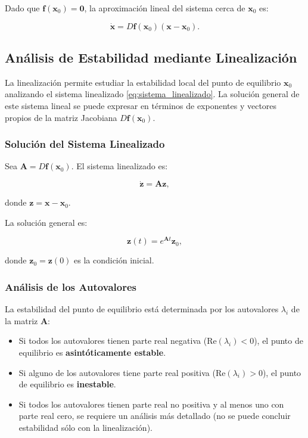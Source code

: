 \documentclass[12pt, a4paper]{report}
\begin{document}
Dado que \(\mathbf{f}(\mathbf{x}_0) = \mathbf{0}\), la aproximación lineal del sistema cerca de \(\mathbf{x}_0\) es:

\begin{equation}\label{eq:sistema_linealizado}
    \dot{\mathbf{x}} = D\mathbf{f}(\mathbf{x}_0)(\mathbf{x} - \mathbf{x}_0).
\end{equation}

\subsection{Análisis de Estabilidad mediante Linealización}

La linealización permite estudiar la estabilidad local del punto de equilibrio \(\mathbf{x}_0\) analizando el sistema linealizado \eqref{eq:sistema_linealizado}. La solución general de este sistema lineal se puede expresar en términos de exponentes y vectores propios de la matriz Jacobiana \( D\mathbf{f}(\mathbf{x}_0) \).

\subsubsection{Solución del Sistema Linealizado}

Sea \( \mathbf{A} = D\mathbf{f}(\mathbf{x}_0) \). El sistema linealizado es:

\begin{equation}
    \dot{\mathbf{z}} = \mathbf{A} \mathbf{z},
\end{equation}

donde \( \mathbf{z} = \mathbf{x} - \mathbf{x}_0 \).

La solución general es:

\begin{equation}
    \mathbf{z}(t) = e^{\mathbf{A} t} \mathbf{z}_0,
\end{equation}

donde \( \mathbf{z}_0 = \mathbf{z}(0) \) es la condición inicial.

\subsubsection{Análisis de los Autovalores}

La estabilidad del punto de equilibrio está determinada por los autovalores \( \lambda_i \) de la matriz \( \mathbf{A} \):

\begin{itemize}
    \item Si todos los autovalores tienen parte real negativa (\( \text{Re}(\lambda_i) < 0 \)), el punto de equilibrio es \textbf{asintóticamente estable}.
    \item Si alguno de los autovalores tiene parte real positiva (\( \text{Re}(\lambda_i) > 0 \)), el punto de equilibrio es \textbf{inestable}.
    \item Si todos los autovalores tienen parte real no positiva y al menos uno con parte real cero, se requiere un análisis más detallado (no se puede concluir estabilidad sólo con la linealización).
\end{itemize}
\end{document}

